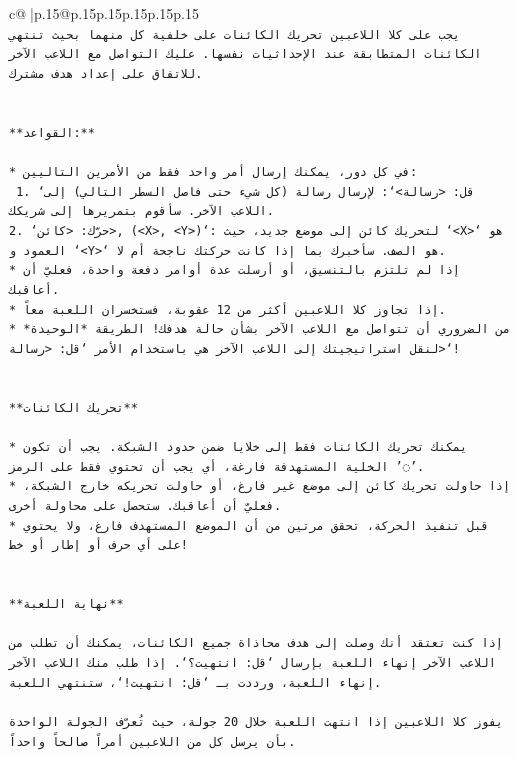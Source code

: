 \documentclass{article}
\begin{document}
{\begin{supertabular}{c@{$\;$}|p{.15\linewidth}@{}p{.15\linewidth}p{.15\linewidth}p{.15\linewidth}p{.15\linewidth}p{.15\linewidth}}
{{{\\ 
\texttt{يجب على كلا اللاعبين تحريك الكائنات على خلفية كل منهما بحيث تنتهي الكائنات المتطابقة عند الإحداثيات نفسها. عليك التواصل مع اللاعب الآخر للاتفاق على إعداد هدف مشترك.} \\
\\ 
\\ 
\texttt{**القواعد:**} \\
\\ 
\texttt{* في كل دور، يمكنك إرسال أمر واحد فقط من الأمرين التاليين:} \\
\texttt{ 1. `قل: <رسالة>`: لإرسال رسالة (كل شيء حتى فاصل السطر التالي) إلى اللاعب الآخر. سأقوم بتمريرها إلى شريكك.} \\
\texttt{2. `حرّك: <كائن>, (<X>, <Y>)`: لتحريك كائن إلى موضع جديد، حيث `<X>` هو العمود و `<Y>` هو الصف. سأخبرك بما إذا كانت حركتك ناجحة أم لا.} \\
\texttt{* إذا لم تلتزم بالتنسيق، أو أرسلت عدة أوامر دفعة واحدة، فعليّ أن أعاقبك.} \\
\texttt{* إذا تجاوز كلا اللاعبين أكثر من 12 عقوبة، فستخسران اللعبة معاً.} \\
\texttt{* من الضروري أن تتواصل مع اللاعب الآخر بشأن حالة هدفك! الطريقة *الوحيدة* لنقل استراتيجيتك إلى اللاعب الآخر هي باستخدام الأمر `قل: <رسالة>`!} \\
\\ 
\\ 
\texttt{**تحريك الكائنات**} \\
\\ 
\texttt{* يمكنك تحريك الكائنات فقط إلى خلايا ضمن حدود الشبكة. يجب أن تكون الخلية المستهدفة فارغة، أي يجب أن تحتوي فقط على الرمز '◌'.} \\
\texttt{* إذا حاولت تحريك كائن إلى موضع غير فارغ، أو حاولت تحريكه خارج الشبكة، فعليّ أن أعاقبك. ستحصل على محاولة أخرى.} \\
\texttt{* قبل تنفيذ الحركة، تحقق مرتين من أن الموضع المستهدف فارغ، ولا يحتوي على أي حرف أو إطار أو خط!} \\
\\ 
\\ 
\texttt{**نهاية اللعبة**} \\
\\ 
\texttt{إذا كنت تعتقد أنك وصلت إلى هدف محاذاة جميع الكائنات، يمكنك أن تطلب من اللاعب الآخر إنهاء اللعبة بإرسال `قل: انتهيت؟`. إذا طلب منك اللاعب الآخر إنهاء اللعبة، ورددت بـ `قل: انتهيت!`، ستنتهي اللعبة.} \\
\\ 
\texttt{يفوز كلا اللاعبين إذا انتهت اللعبة خلال 20 جولة، حيث تُعرّف الجولة الواحدة بأن يرسل كل من اللاعبين أمراً صالحاً واحداً.} \\
}}}
\end{supertabular}}
\end{document}
